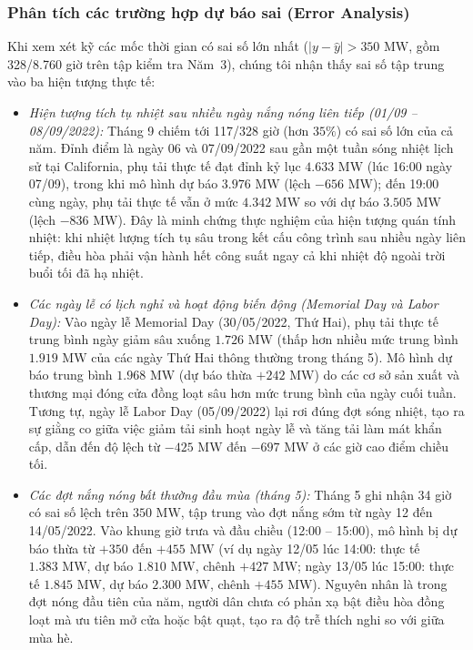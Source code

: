 \subsubsection{Phân tích các trường hợp dự báo sai (Error Analysis)}
Khi xem xét kỹ các mốc thời gian có sai số lớn nhất ($|y - \hat{y}| > 350\text{ MW}$, gồm 328/8.760 giờ trên tập kiểm tra Năm~3), chúng tôi nhận thấy sai số tập trung vào ba hiện tượng thực tế:
\begin{itemize}
    \item \textit{Hiện tượng tích tụ nhiệt sau nhiều ngày nắng nóng liên tiếp (01/09 -- 08/09/2022):} Tháng 9 chiếm tới 117/328 giờ (hơn $35\%$) có sai số lớn của cả năm. Đỉnh điểm là ngày 06 và 07/09/2022 sau gần một tuần sóng nhiệt lịch sử tại California, phụ tải thực tế đạt đỉnh kỷ lục $4.633\text{ MW}$ (lúc 16:00 ngày 07/09), trong khi mô hình dự báo $3.976\text{ MW}$ (lệch $-656\text{ MW}$); đến 19:00 cùng ngày, phụ tải thực tế vẫn ở mức $4.342\text{ MW}$ so với dự báo $3.505\text{ MW}$ (lệch $-836\text{ MW}$). Đây là minh chứng thực nghiệm của hiện tượng quán tính nhiệt: khi nhiệt lượng tích tụ sâu trong kết cấu công trình sau nhiều ngày liên tiếp, điều hòa phải vận hành hết công suất ngay cả khi nhiệt độ ngoài trời buổi tối đã hạ nhiệt.
    \item \textit{Các ngày lễ có lịch nghỉ và hoạt động biến động (Memorial Day và Labor Day):} Vào ngày lễ Memorial Day (30/05/2022, Thứ Hai), phụ tải thực tế trung bình ngày giảm sâu xuống $1.726\text{ MW}$ (thấp hơn nhiều mức trung bình $1.919\text{ MW}$ của các ngày Thứ Hai thông thường trong tháng 5). Mô hình dự báo trung bình $1.968\text{ MW}$ (dự báo thừa $+242\text{ MW}$) do các cơ sở sản xuất và thương mại đóng cửa đồng loạt sâu hơn mức trung bình của ngày cuối tuần. Tương tự, ngày lễ Labor Day (05/09/2022) lại rơi đúng đợt sóng nhiệt, tạo ra sự giằng co giữa việc giảm tải sinh hoạt ngày lễ và tăng tải làm mát khẩn cấp, dẫn đến độ lệch từ $-425\text{ MW}$ đến $-697\text{ MW}$ ở các giờ cao điểm chiều tối.
    \item \textit{Các đợt nắng nóng bất thường đầu mùa (tháng 5):} Tháng 5 ghi nhận 34 giờ có sai số lệch trên $350\text{ MW}$, tập trung vào đợt nắng sớm từ ngày 12 đến 14/05/2022. Vào khung giờ trưa và đầu chiều (12:00 -- 15:00), mô hình bị dự báo thừa từ $+350$ đến $+455\text{ MW}$ (ví dụ ngày 12/05 lúc 14:00: thực tế $1.383\text{ MW}$, dự báo $1.810\text{ MW}$, chênh $+427\text{ MW}$; ngày 13/05 lúc 15:00: thực tế $1.845\text{ MW}$, dự báo $2.300\text{ MW}$, chênh $+455\text{ MW}$). Nguyên nhân là trong đợt nóng đầu tiên của năm, người dân chưa có phản xạ bật điều hòa đồng loạt mà ưu tiên mở cửa hoặc bật quạt, tạo ra độ trễ thích nghi so với giữa mùa hè.
\end{itemize}

